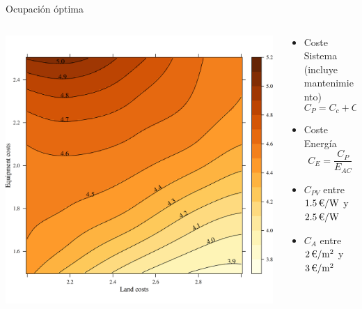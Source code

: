 \documentclass[aspectratio=169, usenames,svgnames,dvipsnames]{beamer}
\begin{document}
\begin{frame}[label={sec:orgb27201a}]{Ocupación óptima}
\begin{columns}
\begin{column}{0.6\columnwidth}
\begin{center}
\includegraphics[height=0.9\textheight]{../figs/GRRoptim.png}
\end{center}
\end{column}

\begin{column}{0.4\columnwidth}
\begin{itemize}
\item Coste Sistema (incluye mantenimiento)
$$C_P = C_c + C_A + C_{PV}$$

\item Coste Energía
$$C_E = \frac{C_P}{E_{AC}}$$

\item \(C_{PV}\) entre \(\SI{1.5}{\text{\texteuro}\per\watt}\) y \(\SI{2.5}{\text{\texteuro}\per\watt}\)

\item \(C_A\) entre \(\SI{2}{\text{\texteuro}\per\meter\squared}\) y \(\SI{3}{\text{\texteuro}\per\meter\squared}\)
\end{itemize}
\end{column}
\end{columns}
\end{frame}
\end{document}
